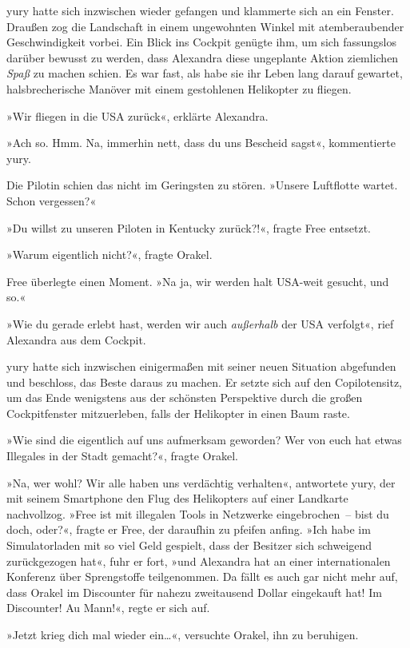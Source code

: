 yury hatte sich inzwischen wieder gefangen und klammerte sich an ein Fenster. Draußen zog die Landschaft in einem ungewohnten Winkel mit atemberaubender Geschwindigkeit vorbei. Ein Blick ins Cockpit genügte ihm, um sich fassungslos darüber bewusst zu werden, dass Alexandra diese ungeplante Aktion ziemlichen \textit{Spaß} zu machen schien. Es war fast, als habe sie ihr Leben lang darauf gewartet, halsbrecherische Manöver mit einem gestohlenen Helikopter zu fliegen.

»Wir fliegen in die USA zurück«, erklärte Alexandra.

»Ach so. Hmm. Na, immerhin nett, dass du uns Bescheid sagst«, kommentierte yury.

Die Pilotin schien das nicht im Geringsten zu stören. »Unsere Luftflotte wartet. Schon vergessen?«

»Du willst zu unseren Piloten in Kentucky zurück?!«, fragte Free entsetzt.

»Warum eigentlich nicht?«, fragte Orakel.

Free überlegte einen Moment. »Na ja, wir werden halt USA-weit gesucht, und so.«

»Wie du gerade erlebt hast, werden wir auch \textit{außerhalb} der USA verfolgt«, rief Alexandra aus dem Cockpit.

yury hatte sich inzwischen einigermaßen mit seiner neuen Situation abgefunden und beschloss, das Beste daraus zu machen. Er setzte sich auf den Copilotensitz, um das Ende wenigstens aus der schönsten Perspektive durch die großen Cockpitfenster mitzuerleben, falls der Helikopter in einen Baum raste.

»Wie sind die eigentlich auf uns aufmerksam geworden? Wer von euch hat etwas Illegales in der Stadt gemacht?«, fragte Orakel.

»Na, wer wohl? Wir alle haben uns verdächtig verhalten«, antwortete yury, der mit seinem Smartphone den Flug des Helikopters auf einer Landkarte nachvollzog. »Free ist mit illegalen Tools in Netzwerke eingebrochen~– bist du doch, oder?«, fragte er Free, der daraufhin zu pfeifen anfing. »Ich habe im Simulatorladen mit so viel Geld gespielt, dass der Besitzer sich schweigend zurückgezogen hat«, fuhr er fort, »und Alexandra hat an einer internationalen Konferenz über Sprengstoffe teilgenommen. Da fällt es auch gar nicht mehr auf, dass Orakel im Discounter für nahezu zweitausend Dollar eingekauft hat! Im Discounter! Au Mann!«, regte er sich auf.

»Jetzt krieg dich mal wieder ein…«, versuchte Orakel, ihn zu beruhigen.


